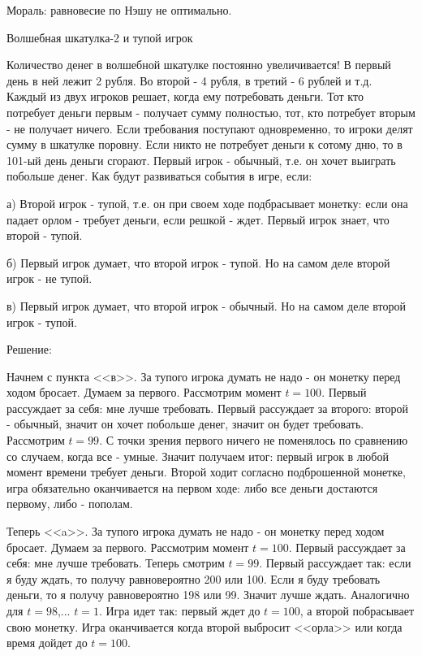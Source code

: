 \documentclass[pdftex,12pt,a4paper]{article}
\begin{document}
Мораль: равновесие по Нэшу не оптимально.

\vspace{10pt}
Волшебная шкатулка-2 и тупой игрок

Количество денег в волшебной шкатулке постоянно увеличивается! В первый день в ней лежит 2 рубля. Во второй - 4 рубля, в третий - 6 рублей и т.д. Каждый из двух игроков решает, когда ему потребовать деньги. Тот кто потребует деньги первым - получает сумму полностью, тот, кто потребует вторым - не получает ничего. Если требования поступают одновременно, то игроки делят сумму в шкатулке поровну. Если никто не потребует деньги к сотому дню, то в 101-ый день деньги сгорают. 
 Первый игрок - обычный, т.е. он хочет выиграть побольше денег. Как будут развиваться события в игре, если:

а) Второй игрок - тупой, т.е. он при своем ходе подбрасывает монетку: если она падает орлом - требует деньги, если решкой - ждет. Первый игрок знает, что второй - тупой.

б) Первый игрок думает, что второй игрок - тупой. Но на самом деле второй игрок - не тупой.

в) Первый игрок думает, что второй игрок - обычный. Но на самом деле второй игрок - тупой.

\vspace{10pt}
Решение:

Начнем с пункта <<в>>. За тупого игрока думать не надо - он монетку перед ходом бросает. Думаем за первого. Рассмотрим момент $t=100$. Первый рассуждает за себя: мне лучше требовать. Первый рассуждает за второго: второй - обычный, значит он хочет побольше денег, значит он будет требовать. Рассмотрим $t=99$. С точки зрения первого ничего не поменялось по сравнению со случаем, когда все - умные. Значит получаем итог: первый игрок в любой момент времени требует деньги. Второй ходит согласно подброшенной монетке, игра обязательно оканчивается на первом ходе: либо все деньги достаются первому, либо - пополам.

Теперь <<a>>. За тупого игрока думать не надо - он монетку перед ходом бросает. Думаем за первого. Рассмотрим момент $t=100$. Первый рассуждает за себя: мне лучше требовать. Теперь смотрим $t=99$. Первый рассуждает так: если я буду ждать, то получу равновероятно 200 или 100. Если я буду требовать деньги, то я получу равновероятно 198 или 99. Значит лучше ждать. Аналогично для $t=98$,... $t=1$. Игра идет так: первый ждет до $t=100$, а второй побрасывает свою монетку. Игра оканчивается когда второй выбросит <<орла>> или когда время дойдет до $t=100$.
\end{document}
